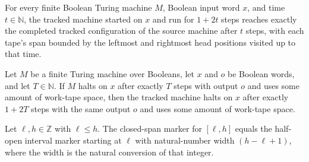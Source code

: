 \begin{lemma}
\label{Turing.FinTM.emCall_track_run}
\leanok
{}
For every finite Boolean Turing machine $M$, Boolean input word $x$, and time
$t\in\mathbb{N}$, the tracked machine started on $x$ and run for $1+2t$ steps reaches
exactly the completed tracked configuration of the source machine after $t$ steps, with
each tape's span bounded by the leftmost and rightmost head positions visited up to that
time.
\end{lemma}

\begin{lemma}
\label{Turing.FinTM.emCall_track_computes}
\leanok
{}
Let $M$ be a finite Turing machine over Booleans, let $x$ and $o$ be Boolean words, and
let $T\in\mathbb{N}$. If $M$ halts on $x$ after exactly $T$ steps with output $o$ and
uses some amount of work-tape space, then the tracked machine halts on $x$ after exactly
$1+2T$ steps with the same output $o$ and uses some amount of work-tape space.
\end{lemma}

\begin{lemma}
\label{Turing.FinTM.emCall_span_interval}
\leanok
{}
Let $\ell,h\in\mathbb{Z}$ with $\ell\le h$. The closed-span marker for $[\ell,h]$ equals
the half-open interval marker starting at $\ell$ with natural-number width $(h-\ell+1)$,
where the width is the natural conversion of that integer.
\end{lemma}

